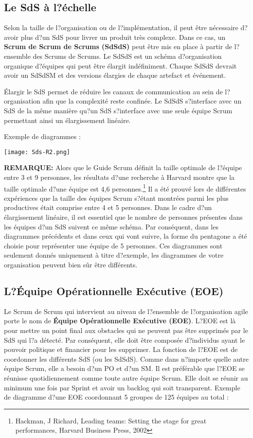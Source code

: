 \documentclass[12pt,a4paper,parskip=full]{scrartcl}
\begin{document}
\subsection{Le SdS à l?échelle}
Selon la taille de l?organisation ou de l?implémentation, il peut être nécessaire d?avoir plus
d?un SdS pour livrer un produit très complexe. Dans ce cas, un \textbf{Scrum de Scrum de
Scrums (SdSdS)} peut être mis en place à partir de l?ensemble des Scrums de Scrums. Le
SdSdS est un schéma d?organisation organique d?équipes qui peut être élargit
indéfiniment. Chaque SdSdS devrait avoir un SdSdSM et des versions élargies de chaque
artefact et événement.

Élargir le SdS permet de réduire les canaux de communication au sein de l?organisation
afin que la complexité reste confinée. Le SdSdS s?interface avec un SdS de la même
manière qu?un SdS s?interface avec une seule équipe Scrum permettant ainsi un
élargissement linéaire.

\pagebreak
Exemple de diagrammes :

\texttt{[image: Sds-R2.png]}

\textbf{\textsc{REMARQUE:}} Alors que le Guide Scrum définit la taille optimale de l?équipe entre 3 et 9
personnes, les résultats d?une recherche à Harvard montre que la taille optimale d?une
équipe est 4,6 personnes.\footnote{Hackman, J Richard, Leading teams: Setting the stage for
great performances, Harvard Business Press, 2002} Il a été prouvé lors de différentes expériences que la taille des
équipes Scrum s?étant montrées parmi les plus productives était comprise entre 4 et 5
personnes. Dans le cadre d?un élargissement linéaire, il est essentiel que le nombre de
personnes présentes dans les équipes d?un SdS suivent ce même schéma. Par
conséquent, dans les diagrammes précédents et dans ceux qui vont suivre, la forme du
pentagone a été choisie pour représenter une équipe de 5 personnes. Ces diagrammes
sont seulement donnés uniquement à titre d?exemple, les diagrammes de votre
organisation peuvent bien sûr être différents.

\subsection{L?Équipe Opérationnelle Exécutive (EOE)}
Le Scrum de Scrum qui intervient au niveau de l?ensemble de l?organisation agile porte le
nom de \textbf{Équipe Opérationnelle Exécutive (EOE)}. L?EOE est là pour mettre un point final
aux obstacles qui ne peuvent pas être supprimés par le SdS qui l?a détecté. Par
conséquent, elle doit être composée d?individus ayant le pouvoir politique et financier pour
les supprimer. La fonction de l?EOE est de coordonner les différents SdS (ou les SdSdS).
Comme dans n?importe quelle autre équipe Scrum, elle a besoin d?un PO et d?un SM. Il est
préférable que l?EOE se réunisse quotidiennement comme toute autre équipe Scrum. Elle
doit se réunir au minimum une fois par Sprint et avoir un backlog qui soit transparent.
Exemple de diagramme d?une EOE coordonnant 5 groupes de 125 équipes au total :
\end{document}
